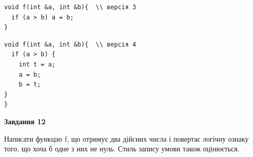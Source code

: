 \documentclass[12pt, ukrainian]{article}
\begin{document}
{\begin {large}
\begin{minipage}[t]{11.0cm}
\vspace{-8mm}\begin{verbatim}
void f(int &a, int &b){  \\ версія 3
  if (a > b) a = b;
}
\end{verbatim}

\vspace{-8mm}\begin{verbatim}
void f(int &a, int &b){  \\ версія 4
  if (a > b) {
    int t = a;
    a = b;
    b = t;
}  
}
\end{verbatim}



\begin{center}
\textbf{Завдання 12}
\end{center}

Написати функцiю f, що отримує два дійсних числа і повертає логічну ознаку того, що хоча б одне з них не нуль. Стиль запису умови також оцінюється.\par

\end{minipage}

\end {large}}
\newpage
\end{document}

